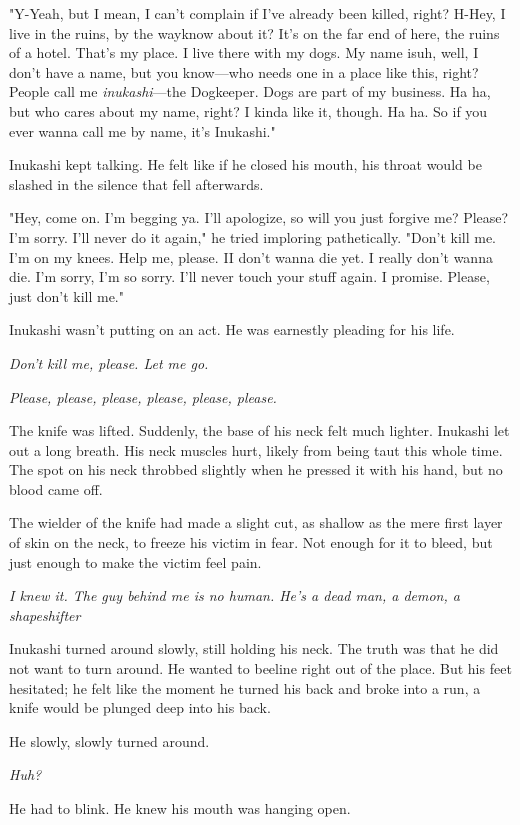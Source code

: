 "Y-Yeah, but I mean, I can't complain if I've already been killed,
right? H-Hey, I live in the ruins, by the way\el know about it? It's on
the far end of here, the ruins of a hotel. That's my place. I live there
with my dogs. My name is\el uh, well, I don't have a name, but you
know---who needs one in a place like this, right? People call me
\emph{inukashi}---the Dogkeeper. Dogs are part of my business. Ha ha, but who
cares about my name, right? I kinda like it, though. Ha ha. So if you
ever wanna call me by name, it's Inukashi."

Inukashi kept talking. He felt like if he closed his mouth, his throat
would be slashed in the silence that fell afterwards.

"Hey, come on. I'm begging ya. I'll apologize, so will you just forgive
me? Please? I'm sorry. I'll never do it again," he tried imploring
pathetically. "Don't kill me. I'm on my knees. Help me, please. I\el I
don't wanna die yet. I really don't wanna die. I'm sorry, I'm so sorry.
I'll never touch your stuff again. I promise. Please, just don't kill
me."

Inukashi wasn't putting on an act. He was earnestly pleading for his
life.

\emph{Don't kill me, please. Let me go.}

\emph{Please, please, please, please, please, please.}

The knife was lifted. Suddenly, the base of his neck felt much lighter.
Inukashi let out a long breath. His neck muscles hurt, likely from being
taut this whole time. The spot on his neck throbbed slightly when he
pressed it with his hand, but no blood came off.

The wielder of the knife had made a slight cut, as shallow as the mere
first layer of skin on the neck, to freeze his victim in fear. Not
enough for it to bleed, but just enough to make the victim feel pain.

\emph{I knew it. The guy behind me is no human. He's a dead man, a demon, a
shapeshifter\el }

Inukashi turned around slowly, still holding his neck. The truth was
that he did not want to turn around. He wanted to beeline right out of
the place. But his feet hesitated; he felt like the moment he turned his
back and broke into a run, a knife would be plunged deep into his back.

He slowly, slowly turned around.

\emph{Huh?}

He had to blink. He knew his mouth was hanging open.


